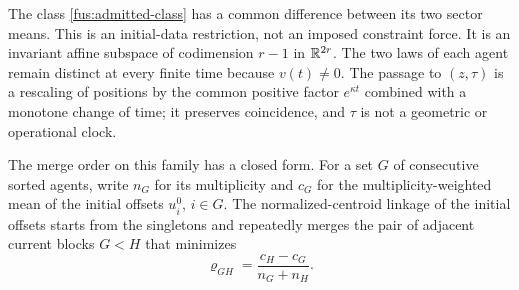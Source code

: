 The class \cref{fus:admitted-class} has a common difference between its
two sector means. This is an initial-data restriction, not an imposed
constraint force. It is an invariant affine subspace of codimension $r-1$
in $\mathbb R^{2r}$. The two laws of each agent remain distinct at every finite
time because $v(t)\ne0$. The passage to $(z,\tau)$ is a rescaling of
positions by the common positive factor $e^{\kappa t}$ combined with a
monotone change of time; it preserves coincidence, and $\tau$ is not a
geometric or operational clock.

The merge order on this family has a closed form. For a set $G$ of
consecutive sorted agents, write $n_G$ for its multiplicity and $c_G$ for
the multiplicity-weighted mean of the initial offsets $u_i^0$, $i\in G$.
The normalized-centroid linkage of the initial offsets starts from the
singletons and repeatedly merges the pair of adjacent current blocks
$G<H$ that minimizes
\begin{equation}
 \varrho_{GH}=\frac{c_H-c_G}{n_G+n_H}.
 \label{fus:ncl-height}
\end{equation}

